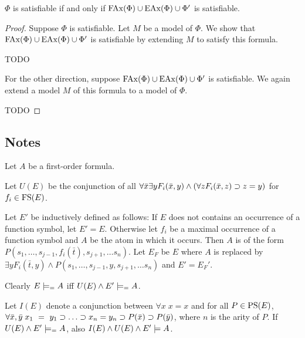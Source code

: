 \begin{prop}
	$\Phi$ is satisfiable if and only if $\mathrm{FAx}(\Phi) \cup \mathrm{EAx}(\Phi) \cup \Phi'$ is satisfiable.
\end{prop}
\begin{proof}
	Suppose $\Phi$ is satisfiable.
	Let $M$ be a model of $\Phi$.
	We show that $\mathrm{FAx}(\Phi) \cup \mathrm{EAx}(\Phi) \cup \Phi'$ is satisfiable by extending $M$ to satisfy this formula.

	TODO

	For the other direction, suppose $\mathrm{FAx}(\Phi) \cup \mathrm{EAx}(\Phi) \cup \Phi'$ is satisfiable. We again extend a model $M$ of this formula to a model of $\Phi$.

	TODO
\end{proof}




\subsection{Notes}


Let $A$ be a first-order formula.

Let $U(E)$ be the conjunction of all $\forall \bar x \exists y F_i(\bar x, y) \land (\forall z F_i(\bar x, z) \supset z = y)$ for $f_i \in \mathrm{FS}(E)$.

Let $E'$ be inductively defined as follows: If $E$ does not contains an occurrence of a function symbol, let $E' = E$.
Otherwise let $f_i$ be a maximal occurrence of a function symbol and $A$ be the atom in which it occurs. Then $A$ is of the form $P(s_1, \ldots, s_{j-1}, f_i(\bar t), s_{j+1}, \ldots s_n)$.
Let $E_F$ be $E$ where $A$ is replaced by $\exists y F_i(\bar t, y) \land P(s_1, \ldots, s_{j-1}, y, s_{j+1}, \ldots s_n)$ and $E' = E_F'$.

Clearly $E \models_= A$ iff $U(E) \land  E' \models_= A$.

Let $I(E)$ denote a conjunction between $\forall x \; x=x$ and for all $P \in\mathrm{PS}(E)$, $\forall \bar x, \bar y\; x_1~=~y_1 \supset \ldots \supset x_n = y_n \supset P(\bar x) \supset P(\bar y)$, where $n$ is the arity of $P$.
If $U(E) \land E' \models_= A$,
also $I(E) \land U(E) \land E' \models A$. 

